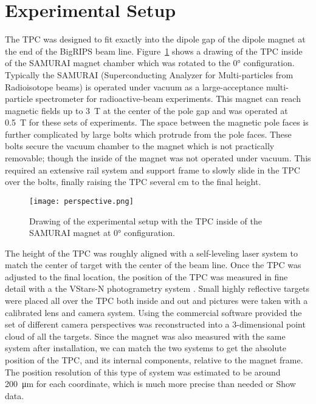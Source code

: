 \section{Experimental Setup}

The \spirit TPC was designed to fit exactly into the dipole gap of the  dipole magnet at the end of the BigRIPS beam line. Figure~\ref{fig:experiment} shows a drawing of the \spirit TPC inside of the SAMURAI magnet chamber which was rotated to the $\ang{0}$ configuration. Typically the SAMURAI (Superconducting Analyzer for Multi-particles from Radioisotope beams) is operated under vacuum as a large-acceptance multi-particle spectrometer for radioactive-beam experiments. This magnet can reach magnetic fields up to \SI{3}{\tesla} at the center of the pole gap and was operated at \SI{0.5}{\tesla} for these sets of experiments. The space between the magnetic pole faces is further complicated by large bolts which protrude from the pole faces. These bolts secure the vacuum chamber to the magnet which is not practically removable; though the inside of the magnet was not operated under vacuum. This required an extensive rail system and support frame to slowly slide in the TPC over the bolts, finally raising the TPC several \si{\centi\metre} to the final height. 

\begin{figure}
\texttt{[image: perspective.png]}
\caption{Drawing of the experimental setup with the TPC inside of the SAMURAI magnet at $\ang{0}$ configuration.}
\label{fig:experiment}
\end{figure}

The height of the TPC was roughly aligned with a self-leveling laser system to match the center of target with the center of the beam line. Once the TPC was adjusted to the final location, the position of the TPC was measured in fine detail with a the VStars-N photogrametry system \cite{vstars}. Small highly reflective targets were placed all over the TPC both inside and out and pictures were taken with a calibrated lens and camera system. Using the commercial software provided the set of different camera perspectives was reconstructed into a 3-dimensional point cloud of all the targets. Since the magnet was also measured with the same system after installation, we can match the two systems to get the absolute position of the TPC, and its internal components, relative to the magnet frame. The position resolution of this type of system was estimated to be around \SI{200}{\micro\metre} for each coordinate, which is much more precise than needed or Show data.


